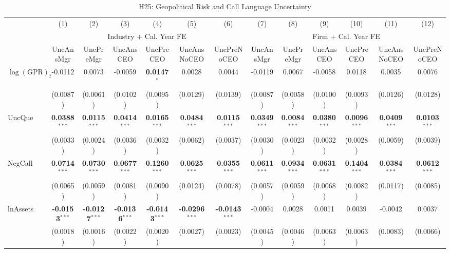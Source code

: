 \begin{landscape}
\begin{table}[H]
\setlength{\tabcolsep}{3pt}
\renewcommand{\arraystretch}{0.85}
\centering
\caption{H25: Geopolitical Risk and Call Language Uncertainty}
\label{tab:h25_gpr}
\scriptsize
\begin{tabular}{lcccccccccccc}
\toprule
 & (1) & (2) & (3) & (4) & (5) & (6) & (7) & (8) & (9) & (10) & (11) & (12) \\
 & \multicolumn{6}{c}{Industry + Cal. Year FE} & \multicolumn{6}{c}{Firm + Cal. Year FE} \\
\cmidrule(lr){2-7} \cmidrule(lr){8-13}
 & UncAnsMgr & UncPreMgr & UncAnsCEO & UncPreCEO & UncAnsNoCEO & UncPreNoCEO & UncAnsMgr & UncPreMgr & UncAnsCEO & UncPreCEO & UncAnsNoCEO & UncPreNoCEO \\
\midrule
$\log(\text{GPR})_{t}$ & -0.0112 & 0.0073 & -0.0059 & \textbf{0.0147}$^{*}$ & 0.0028 & 0.0044 & -0.0119 & 0.0067 & -0.0058 & 0.0118 & 0.0035 & 0.0076 \\
 & (0.0087) & (0.0061) & (0.0102) & (0.0095) & (0.0129) & (0.0139) & (0.0087) & (0.0058) & (0.0100) & (0.0093) & (0.0126) & (0.0128) \\
\midrule
UncQue & \textbf{0.0388}$^{***}$ & \textbf{0.0115}$^{***}$ & \textbf{0.0414}$^{***}$ & \textbf{0.0165}$^{***}$ & \textbf{0.0484}$^{***}$ & \textbf{0.0115}$^{***}$ & \textbf{0.0349}$^{***}$ & \textbf{0.0084}$^{***}$ & \textbf{0.0380}$^{***}$ & \textbf{0.0096}$^{***}$ & \textbf{0.0409}$^{***}$ & \textbf{0.0103}$^{***}$ \\
 & (0.0033) & (0.0024) & (0.0036) & (0.0032) & (0.0062) & (0.0037) & (0.0030) & (0.0023) & (0.0032) & (0.0028) & (0.0059) & (0.0039) \\
NegCall & \textbf{0.0714}$^{***}$ & \textbf{0.0730}$^{***}$ & \textbf{0.0677}$^{***}$ & \textbf{0.1260}$^{***}$ & \textbf{0.0625}$^{***}$ & \textbf{0.0355}$^{***}$ & \textbf{0.0611}$^{***}$ & \textbf{0.0934}$^{***}$ & \textbf{0.0631}$^{***}$ & \textbf{0.1404}$^{***}$ & \textbf{0.0384}$^{***}$ & \textbf{0.0612}$^{***}$ \\
 & (0.0065) & (0.0059) & (0.0081) & (0.0090) & (0.0124) & (0.0078) & (0.0057) & (0.0059) & (0.0068) & (0.0082) & (0.0117) & (0.0085) \\
lnAssets & \textbf{-0.0153}$^{***}$ & \textbf{-0.0127}$^{***}$ & \textbf{-0.0136}$^{***}$ & \textbf{-0.0143}$^{***}$ & \textbf{-0.0296}$^{***}$ & \textbf{-0.0143}$^{***}$ & -0.0004 & 0.0028 & 0.0011 & 0.0039 & -0.0042 & 0.0037 \\
 & (0.0018) & (0.0016) & (0.0022) & (0.0020) & (0.0027) & (0.0023) & (0.0045) & (0.0046) & (0.0063) & (0.0063) & (0.0083) & (0.0066) \\

\end{tabular}
\end{table}
\end{landscape}
